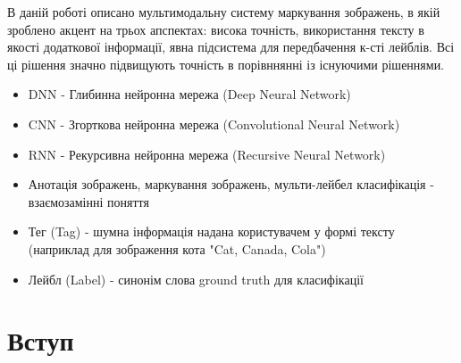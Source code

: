 \documentclass{udstu}
\begin{document}


\abstractUkr

В даній роботі описано мультимодальну систему маркування зображень, в якій зроблено акцент на трьох апспектах:
висока точність, використання тексту в якості додаткової інформації, явна підсистема для передбачення к-сті лейблів.
Всі ці рішення значно підвищують точність в порівннянні із існуючими рішеннями.

\shortings

\begin{itemize}[*]
	\item DNN - Глибинна нейронна мережа (Deep Neural Network)
	\item CNN - Згорткова нейронна мережа (Convolutional Neural Network)
	\item RNN - Рекурсивна нейронна мережа (Recursive Neural Network)
	\item Анотація зображень, маркування зображень, мульти-лейбел класифікація - взаємозамінні поняття
	\item Тег (Tag) - шумна інформація надана користувачем у формі тексту
	(наприклад для зображення кота "Cat, Canada, Cola")
	\item Лейбл (Label) - синонім слова ground truth для класифікації
\end{itemize}


\tableofcontents


\chapter{Вступ}
\end{document}
